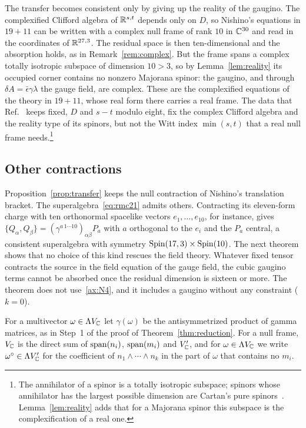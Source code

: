 \begin{remark}
\label{rem:transfercomplex}
The transfer becomes consistent only by giving up the reality of the gaugino. The complexified Clifford algebra of $\mathbb{R}^{s,t}$ depends only on $D$, so Nishino's equations in $19+11$ can be written with a complex null frame of rank $10$ in $\mathbb{C}^{30}$ and read in the coordinates of $\mathbb{R}^{27,3}$. The residual space is then ten-dimensional and the absorption holds, as in Remark~\ref{rem:complex}. But the frame spans a complex totally isotropic subspace of dimension $10>3$, so by Lemma~\ref{lem:reality} its occupied corner contains no nonzero Majorana spinor: the gaugino, and through $\delta A=\bar\epsilon\gamma\lambda$ the gauge field, are complex. These are the complexified equations of the theory in $19+11$, whose real form there carries a real frame. The data that Ref.~\cite{RiosMarraniChester2019} keeps fixed, $D$ and $s-t$ modulo eight, fix the complex Clifford algebra and the reality type of its spinors, but not the Witt index $\min(s,t)$ that a real null frame needs.\footnote{The annihilator of a spinor is a totally isotropic subspace; spinors whose annihilator has the largest possible dimension are Cartan's pure spinors~\cite{Chevalley1954,BudinichTrautman1988}. Lemma~\ref{lem:reality} adds that for a Majorana spinor this subspace is the complexification of a real one.}
\end{remark}

\subsection{Other contractions}
\label{ssec:othercontractions}

Proposition~\ref{prop:transfer} keeps the null contraction of Nishino's translation bracket. The superalgebra~\eqref{eq:rmc21} admits others. Contracting its eleven-form charge with ten orthonormal spacelike vectors $e_1,\dots,e_{10}$, for instance, gives $\{Q_\alpha,Q_\beta\}=(\gamma^{a\,1\cdots10})_{\alpha\beta}P_a$ with $a$ orthogonal to the $e_i$ and the $P_a$ central, a consistent superalgebra with symmetry $\operatorname{Spin}(17,3)\times\operatorname{Spin}(10)$. The next theorem shows that no choice of this kind rescues the field theory. Whatever fixed tensor contracts the source in the field equation of the gauge field, the cubic gaugino terms cannot be absorbed once the residual dimension is sixteen or more. The theorem does not use~\ref{ax:N4}, and it includes a gaugino without any constraint ($k=0$).

For a multivector $\omega\in\Lambda V_{\mathbb{C}}$ let $\gamma(\omega)$ be the antisymmetrized product of gamma matrices, as in Step~1 of the proof of Theorem~\ref{thm:reduction}. For a null frame, $V_{\mathbb{C}}$ is the direct sum of $\operatorname{span}(n_i)$, $\operatorname{span}(m_i)$ and $V'_{\mathbb{C}}$, and for $\omega\in\Lambda V_{\mathbb{C}}$ we write $\omega^\circ\in\Lambda V'_{\mathbb{C}}$ for the coefficient of $n_1\wedge\cdots\wedge n_k$ in the part of $\omega$ that contains no $m_i$.

